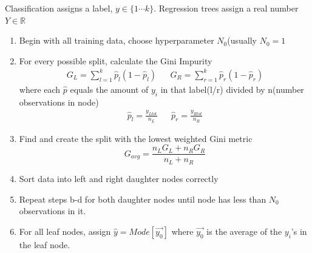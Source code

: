 \documentclass[12pt]{article}
\begin{document}
\begin{enumerate}


Classification assigns a label, $y\in\{1\cdots k\}$. Regression trees assign a real number $Y\in\mathbb{R}$



\begin{enumerate}
	\item Begin with all training data, choose hyperparameter $N_0$(usually $N_0=1$
    
    \item For every possible split, calculate the Gini Impurity
    	\begin{eqnarray*}
    		G_{L}=\sum\limits_{l=1}^k\hat{p}_l(1-\hat{p}_l) && G_{R}=\sum\limits_{r=1}^k\hat{p}_r(1-\hat{p}_r)
    	\end{eqnarray*} where each $\hat{p}$ equals the amount of $y_i$ in that label(l/r) divided by n(number 					observations in node)
        \begin{eqnarray*}
        	\hat{p}_l=\frac{y_{Ltot}}{n_L} && \hat{p}_r=\frac{y_{Rtot}}{n_R}
        \end{eqnarray*}
        
	\item Find and create the split with the lowest weighted Gini metric
    	\begin{equation*}
    		G_{avg}=\frac{n_LG_L+n_RG_R}{n_L+n_R}
    	\end{equation*}
        
	\item Sort data into left and right daughter nodes correctly
    
    \item Repeat steps b-d for both daughter nodes until node has less than $N_0$ observations in it.
    
    \item For all leaf nodes, assign $\hat{y}=Mode[\vec{y_0}]$ where $\vec{y_0}$ is the average of the 	$y_i$'s in the leaf node.
    
\end{enumerate}

\end{enumerate}

\end{document}
